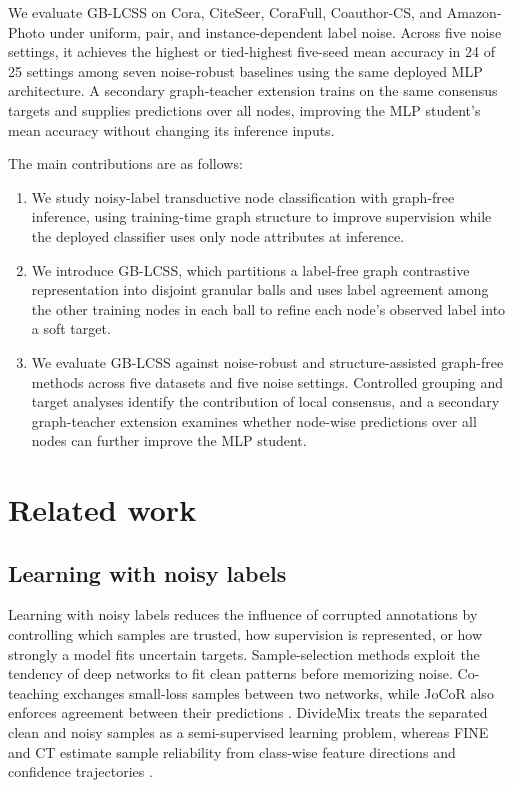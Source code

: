 \documentclass[preprint,12pt]{elsarticle}
\begin{document}
We evaluate GB-LCSS on Cora, CiteSeer, CoraFull, Coauthor-CS, and Amazon-Photo under uniform, pair, and instance-dependent label noise. Across five noise settings, it achieves the highest or tied-highest five-seed mean accuracy in 24 of 25 settings among seven noise-robust baselines using the same deployed MLP architecture. A secondary graph-teacher extension trains on the same consensus targets and supplies predictions over all nodes, improving the MLP student's mean accuracy without changing its inference inputs.

The main contributions are as follows:

\begin{enumerate}
\item We study noisy-label transductive node classification with graph-free inference, using training-time graph structure to improve supervision while the deployed classifier uses only node attributes at inference.
\item We introduce GB-LCSS, which partitions a label-free graph contrastive representation into disjoint granular balls and uses label agreement among the other training nodes in each ball to refine each node's observed label into a soft target.
\item We evaluate GB-LCSS against noise-robust and structure-assisted graph-free methods across five datasets and five noise settings. Controlled grouping and target analyses identify the contribution of local consensus, and a secondary graph-teacher extension examines whether node-wise predictions over all nodes can further improve the MLP student.
\end{enumerate}

\FloatBarrier

\section{Related work}\label{sec:2}

\subsection{Learning with noisy labels}\label{sec:2.1}

Learning with noisy labels reduces the influence of corrupted annotations by controlling which samples are trusted, how supervision is represented, or how strongly a model fits uncertain targets. Sample-selection methods exploit the tendency of deep networks to fit clean patterns before memorizing noise. Co-teaching exchanges small-loss samples between two networks, while JoCoR also enforces agreement between their predictions \cite{ref17,ref18}. DivideMix treats the separated clean and noisy samples as a semi-supervised learning problem, whereas FINE and CT estimate sample reliability from class-wise feature directions and confidence trajectories \cite{ref23,ref24,ref25}.
\end{document}
